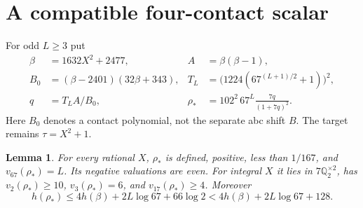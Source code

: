 \documentclass[11pt]{article}
\newtheorem{lemma}[theorem]{Lemma}
\newcommand{\Q}{\mathbb Q}\newcommand{\Z}{\mathbb Z}
\begin{document}
\section{A compatible four-contact scalar}
For odd $L\ge3$ put
\begin{align*}
 \beta&=1632X^2+2477,& A&=\beta(\beta-1),\\
 B_0&=(\beta-2401)(32\beta+343),&
 T_L&=\bigl(1224(67^{(L+1)/2}+1)\bigr)^2,\\
 q&=T_LA/B_0,&
 \rho_*&=102^2\,67^L\frac{7q}{(1+7q)^2}.
\end{align*}
Here $B_0$ denotes a contact polynomial, not the separate abc shift $B$.
The target remains $\tau=X^2+1$.

\begin{lemma}\label{scalarlemma}
For every rational $X$, $\rho_*$ is defined, positive, less than $1/167$,
and $v_{67}(\rho_*)=L$. Its negative valuations are even. For integral
$X$ it lies in $7\Q_2^{\times2}$, has $v_2(\rho_*)\ge10$,
$v_3(\rho_*)=6$, and $v_{17}(\rho_*)\ge4$. Moreover
\begin{equation}\label{height}
 h(\rho_*)\le4h(\beta)+2L\log67+66\log2
             <4h(\beta)+2L\log67+128.
\end{equation}
\end{lemma}
\end{document}
